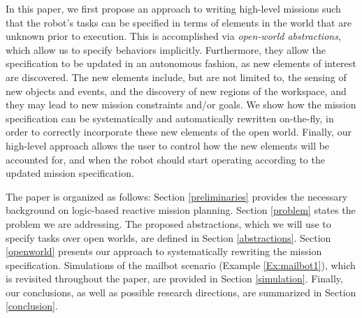In this paper, we first propose an approach to writing high-level missions such that the robot's tasks can be specified in terms of elements in the world that are unknown prior to execution. This is accomplished via \emph{open-world abstractions}, which allow us to specify behaviors implicitly. 
Furthermore, they allow the specification to be updated in an autonomous fashion, as new elements of interest are discovered. The new elements include, but are not limited to, the sensing of new objects and events, and the discovery of new regions of the workspace, and they may lead to new mission constraints and/or goals.
We show how the mission specification can be systematically and automatically rewritten on-the-fly, in order to correctly incorporate these new elements of the open world. 
Finally, our high-level approach allows the user to control how the new elements will be accounted for, and when the robot should start operating according to the updated mission specification.

The paper is organized as follows: Section \ref{preliminaries} provides the necessary background on logic-based reactive mission planning. Section \ref{problem} states the problem we are addressing. The proposed abstractions, which we will use to specify tasks over open worlds, are defined in Section \ref{abstractions}. Section \ref{openworld} presents our approach to systematically rewriting the mission specification. Simulations of the mailbot scenario (Example \ref{Ex:mailbot1}), which is revisited throughout the paper, are provided in Section \ref{simulation}. Finally, our conclusions, as well as possible research directions, are summarized in Section \ref{conclusion}.


